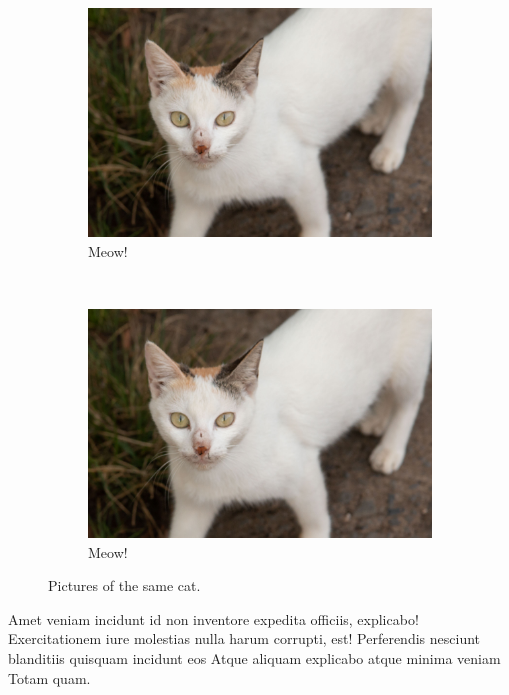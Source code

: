 \documentclass[
    14pt,
    letterpaper,
]{extreport}
\begin{document}
\begin{figure}[H]
    \centering
    \begin{subfigure}[b]{0.4\textwidth}
        \includegraphics[width=\textwidth]{./assets/cat}
        \caption{Meow!}\label{fig:anothercat}
    \end{subfigure}
    ~
    \begin{subfigure}[b]{0.4\textwidth}
        \includegraphics[width=\textwidth]{./assets/cat}
        \caption{Meow!}\label{fig:yetanothercat}
    \end{subfigure}
    \caption{Pictures of the same cat.}\label{fig:labelforcats}
\end{figure}

Amet veniam incidunt id non inventore expedita officiis, explicabo! Exercitationem iure molestias nulla harum corrupti, est! Perferendis nesciunt blanditiis quisquam incidunt eos Atque aliquam explicabo atque minima veniam Totam quam.
\end{document}
